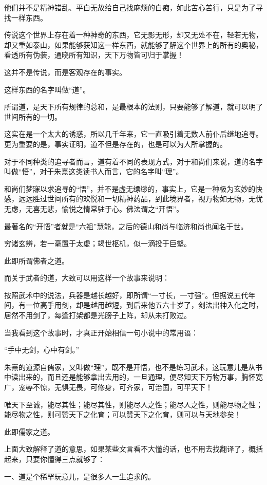 \begin{multicols}{\theparacolNo}
他们并不是精神错乱、平白无故给自己找麻烦的白痴，如此苦心苦行，只是为了寻找一样东西。

传说这个世界上存在着一种神奇的东西，它无影无形，却又无处不在，轻若无物，却又重如泰山，如果能够获知这一样东西，就能够了解这个世界上的所有的奥秘，看透所有伪装，通晓所有知识，天下万物皆可归于掌握！

这并不是传说，而是客观存在的事实。

这样东西的名字叫做“道”。

所谓道，是天下所有规律的总和，是最根本的法则，只要能够了解道，就可以明了世间所有的一切。

这实在是一个太大的诱惑，所以几千年来，它一直吸引着无数人前仆后继地追寻。更为重要的是，事实证明，道不但是存在的，也是可以为人所掌握的。

对于不同种类的追寻者而言，道有着不同的表现方式，对于和尚们来说，道的名字叫做“悟”，对于朱熹这类读书人而言，它的名字叫“理”。

和尚们梦寐以求追寻的“悟”，并不是虚无缥缈的，事实上，它是一种极为玄妙的快感，远远胜过世间所有的欢悦和一切精神药品，到此境界者，视万物如无物，无忧无虑，无喜无悲，愉悦之情常驻于心。佛法谓之“开悟”。

最著名的“开悟”者就是“六祖”慧能，之后的德山和尚与临济和尚也闻名于世。

穷诸玄辨，若一毫置于太虚；竭世枢机，似一滴投于巨壑。

此即所谓佛者之道。

而关于武者的道，大致可以用这样一个故事来说明：

按照武术中的说法，兵器是越长越好，即所谓“一寸长，一寸强”。但据说五代年间，有一位高手用剑，却是越用越短，到后来他五六十岁了，剑法出神入化之时，居然不用剑了，每逢打架都是光膀子上阵，却从未打败过。

当我看到这个故事时，才真正开始相信一句小说中的常用语：

“手中无剑，心中有剑。”

朱熹的道源自儒家，又叫做“理”，既不是开悟，也不是练习武术，这玩意儿是从书中读出来的，而且还是能够拿出去用的，一旦通理，便尽知天下万物万事，胸怀宽广，宠辱不惊，无惧无畏，可修身，可齐家，可治国，可平天下！

唯天下至诚，能尽其性；能尽其性，则能尽人之性；能尽人之性，则能尽物之性；能尽物之性，则可赞天下之化育；可以赞天下之化育，则可以与天地参矣！

此即儒家之道。

上面大致解释了道的意思，如果某些文言看不大懂的话，也不用去找翻译了，概括起来，只要你懂得三点就够了：

一、道是个稀罕玩意儿，是很多人一生追求的。


\end{multicols}

